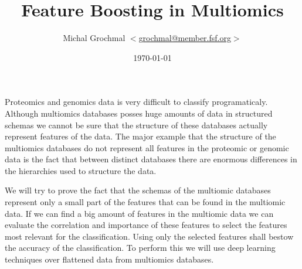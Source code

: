 \documentclass[a4paper,12pt]{article}
\title{Feature Boosting in Multiomics}
\author{Michal Grochmal
  $<$\href{mailto:grochmal@member.fsf.org}{grochmal@member.fsf.org}$>$
}
\date{\today}
\begin{document}
\maketitle
\thispagestyle{empty}

Proteomics and genomics data is very difficult to classify programaticaly.
Although multiomics databases posses huge amounts of data in structured schemas
we cannot be sure that the structure of these databases actually represent
features of the data.  The major example that the structure of the multiomics
databases do not represent all features in the proteomic or genomic data is the
fact that between distinct databases there are enormous differences in the
hierarchies used to structure the data.

We will try to prove the fact that the schemas of the multiomic databases
represent only a small part of the features that can be found in the multiomic
data.  If we can find a big amount of features in the multiomic data we can
evaluate the correlation and importance of these features to select the
features most relevant for the classification.  Using only the selected
features shall bestow the accuracy of the classification.  To perform this we
will use deep learning techniques over flattened data from multiomics
databases.
\end{document}
